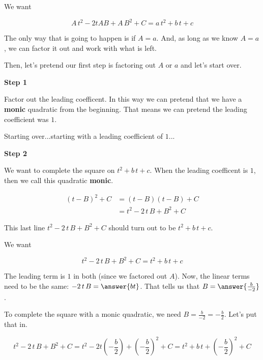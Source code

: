 \documentclass{ximera}
\begin{document}
We want


\[ A \, t^2 - 2 t A B + A \, B^2 + C = a \, t^2 + b \, t + c \]



The only way that is going to happen is if $A = a$. And, as long as we know $A = a$, we can factor it out and work with what is left.

Then, let's pretend our first step is factoring out $A$ or $a$ and let's start over. 






\textbf{\textcolor{blue!75!black}{Step 1}} 

 Factor out the leading coefficent.   In this way we can pretend that we have a \textbf{monic} quadratic from the beginning.  That means we can pretend the leading coefficient was $1$.


Starting over...starting with a leading coefficient of $1$...


\textbf{\textcolor{blue!75!black}{Step 2}} 


We want to complete the square on $t^2 + b \, t + c$.  When the leading coefficent is $1$, then we call this quadratic \textbf{monic}.



\begin{align*}
(t-B)^2 + C & = (t - B)(t - B) + C \\
& = t^2 - 2 \, t \, B + B^2 + C  
\end{align*}


This last line $t^2 - 2 \, t \, B + B^2 + C$ should turn out to be $t^2 + b \, t + c$.

We want


\[   t^2 - 2 \, t \, B + B^2 + C = t^2 + b \, t + c   \]



\begin{explanation}


The leading term is $1$ in both (since we factored out $A$). Now, the linear terms need to be the same: $ - 2 \, t \, B = \answer{b t}$.  That tells us that $B = \answer{\frac{b}{-2}}$.

\end{explanation}


To complete the square with a monic quadratic, we need $B = \frac{b}{-2} = -\frac{b}{2}$.  Let's put that in.


\[ t^2 - 2 \, t \, B + B^2 + C = t^2 - 2 t \left( -\frac{b}{2} \right) + \left( -\frac{b}{2} \right)^2 + C = t^2 + b \, t + \left(-\frac{b}{2}\right)^2 + C \]
\end{document}

